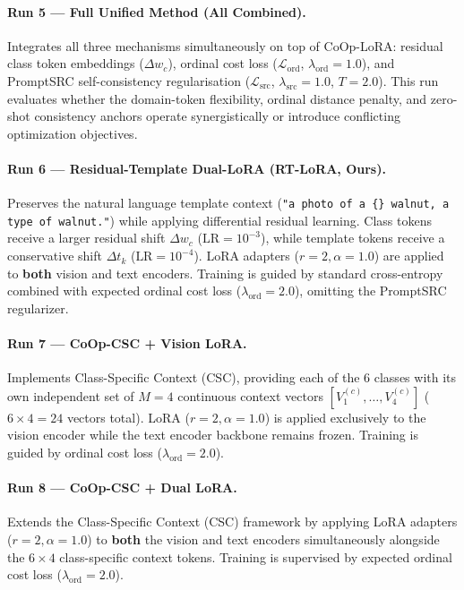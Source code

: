 \documentclass[letterpaper,11pt,leqno]{article}
\begin{document}
\paragraph{Run 5 --- Full Unified Method (All Combined).}
Integrates all three mechanisms simultaneously on top of CoOp-LoRA: residual class
token embeddings ($\Delta w_c$), ordinal cost loss ($\mathcal{L}_\mathrm{ord}$, $\lambda_\mathrm{ord}{=}1.0$),
and PromptSRC self-consistency regularisation ($\mathcal{L}_\mathrm{src}$, $\lambda_\mathrm{src}{=}1.0$, $T{=}2.0$).
This run evaluates whether the domain-token flexibility, ordinal distance penalty, and zero-shot consistency
anchors operate synergistically or introduce conflicting optimization objectives.

\paragraph{Run 6 --- Residual-Template Dual-LoRA (RT-LoRA, Ours).}
Preserves the natural language template context
(\texttt{"a photo of a \{\} walnut, a type of walnut."}) while applying differential residual learning.
Class tokens receive a larger residual shift $\Delta w_c$ ($\text{LR}{=}10^{-3}$), while template tokens receive
a conservative shift $\Delta t_k$ ($\text{LR}{=}10^{-4}$). LoRA adapters ($r{=}2, \alpha{=}1.0$) are applied
to \textbf{both} vision and text encoders. Training is guided by standard cross-entropy combined with expected ordinal cost loss
($\lambda_\mathrm{ord}{=}2.0$), omitting the PromptSRC regularizer.

\paragraph{Run 7 --- CoOp-CSC + Vision LoRA.}
Implements Class-Specific Context (CSC), providing each of the 6 classes with its own independent set of $M{=}4$ continuous context vectors $[V_1^{(c)}, \dots, V_4^{(c)}]$ ($6 \times 4 = 24$ vectors total). LoRA ($r{=}2, \alpha{=}1.0$) is applied exclusively to the vision encoder while the text encoder backbone remains frozen. Training is guided by ordinal cost loss ($\lambda_\mathrm{ord}{=}2.0$).

\paragraph{Run 8 --- CoOp-CSC + Dual LoRA.}
Extends the Class-Specific Context (CSC) framework by applying LoRA adapters ($r{=}2, \alpha{=}1.0$) to \textbf{both} the vision and text encoders simultaneously alongside the $6 \times 4$ class-specific context tokens. Training is supervised by expected ordinal cost loss ($\lambda_\mathrm{ord}{=}2.0$).
\end{document}

